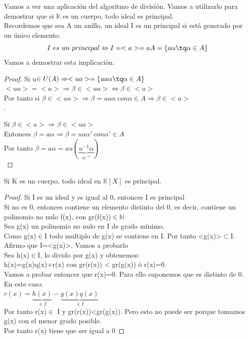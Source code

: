 \documentclass[nochap]{apuntes}
\begin{document}
Vamos a ver una aplicación del algoritmo de división. Vamos a utilizarlo para demostrar que si $\mathbb{K}$  es un cuerpo, todo ideal es
principal.\\
 Recordemos que sea A un anillo, un ideal I es un principal si está generado por un único elemento.\\
 \[I \ es \ un \ principal \Leftrightarrow I=<a>=aA=\{a\alpha \tq \alpha\in A\}\]
 Vamos a demostrar esta implicación.
 \begin{proof}
 Si u$\in U(A) \Rightarrow <ua>=\{ua\alpha \tq \alpha\in A\}$\\
 $<ua>=<a> \Rightarrow \beta \in <ua> \Leftrightarrow \beta \in <a>$\\
 Por tanto si $\beta \in <ua> \Rightarrow \beta = ua\alpha \ con \alpha\in A \Rightarrow \beta\in <a>$\\.
 
 Si $\beta \in <a> \Rightarrow \beta \in <ua>$\\
 Entonces $\beta=a\alpha \Rightarrow \beta=ua\alpha' \ con \alpha '\in A$\\
 Por tanto $\beta=a\alpha=au(\underbrace{u^{-1}\alpha}_{\alpha^{-1}})$\\
\end{proof}

\begin{theorem}
 Si K es un cuerpo, todo ideal en $\mathbb{K}[X]$  es principal.
\end{theorem}
\begin{proof}
  Si I es un ideal y es igual al 0, entonces I es principal\\
 Si no es 0, entonces contiene un elemento distinto del 0, es decir, contiene un polinomio no nulo f(x), con gr(f(x))$\in\mathbb{N}$\\
 Sea g(x) un polinomio no nulo en I de grado mínimo.\\
 Como g(x)$\in$I todo multiplo de g(x) se contiene en I. Por tanto <g(x)>$\subset$I.\\
 
 Afirmo que I=<g(x)>. Vamos a probarlo\\
 Sea h(x)$\in$I, lo divido por g(x) y obtenemos:\\
 h(x)=g(x)q(x)+r(x) con gr(r(x)) < gr(g(x)) ó r(x)=0.\\
 
 Vamos a probar entonces que r(x)=0. Para ello suponemos que es distinto de 0. En este caso:\\
 $r(x)=\underbrace{h(x)}_{\in I}-\underbrace{g(x)q(x)}_{\in I}$\\
 Por tanto r(x)$\in$ I y gr(r(x))<gr(g(x)). Pero esto no puede ser porque tomamos g(x) con el menor grado posible.\\
 Por tanto r(x) tiene que ser igual a 0
\end{proof}
\end{document}
